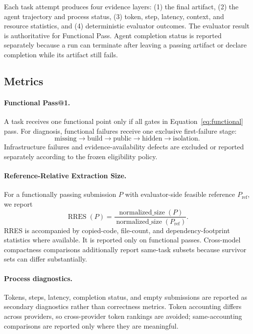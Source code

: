 \documentclass[acmsmall,screen,review,anonymous]{acmart}
\newcommand{\rres}{\textsc{RRES}\xspace}
\begin{document}
Each task attempt produces four evidence layers: (1) the final artifact, (2) the
agent trajectory and process status, (3) token, step, latency, context, and
resource statistics, and (4) deterministic evaluator outcomes. The evaluator
result is authoritative for Functional Pass. Agent completion status is reported
separately because a run can terminate after leaving a passing artifact or declare
completion while its artifact still fails.

\subsection{Metrics}
\label{sec:metrics}

\paragraph{Functional Pass@1.}
A task receives one functional point only if all gates in
Equation~\ref{eq:functional} pass. For diagnosis, functional failures receive one
exclusive first-failure stage:
\begin{equation}
  \text{missing} \rightarrow \text{build} \rightarrow \text{public}
  \rightarrow \text{hidden} \rightarrow \text{isolation}.
\end{equation}
Infrastructure failures and evidence-availability defects are excluded or reported
separately according to the frozen eligibility policy.

\paragraph{Reference-Relative Extraction Size.}
For a functionally passing submission $P$ with evaluator-side feasible reference
$P_{\mathrm{ref}}$, we report
\begin{equation}
  \operatorname{RRES}(P)
  = \frac{\operatorname{normalized\_size}(P)}
         {\operatorname{normalized\_size}(P_{\mathrm{ref}})}.
  \label{eq:rres}
\end{equation}
\rres is accompanied by copied-code, file-count, and dependency-footprint
statistics where available. It is reported only on functional passes. Cross-model
compactness comparisons additionally report same-task subsets because survivor
sets can differ substantially.

\paragraph{Process diagnostics.}
Tokens, steps, latency, completion status, and empty submissions are reported as
secondary diagnostics rather than correctness metrics. Token accounting differs
across providers, so cross-provider token rankings are avoided; same-accounting
comparisons are reported only where they are meaningful.
\end{document}
